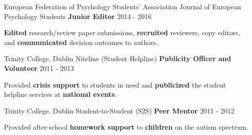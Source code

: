 \begin{cventries}
  \cventry
    {European Federation of Psychology Students' Association}
    {Journal of European Psychology Students} %
    {\textbf{Junior Editor}} %
    {2014 - 2016} %
    {
      \begin{cvitems} %
        \item {\textbf{Edited} research/review paper submissions, \textbf{recruited} reviewers, copy editors, and \textbf{communicated} decision outcomes to authors.}
      \end{cvitems}
    }
    
  \cventry
  	{Trinity College, Dublin}
  	{Niteline (Student Helpline)} %
    {\textbf{Publicity Officer and Volunteer}} %
    {2011 - 2013} %
    {
      \begin{cvitems} %
        \item {Provided \textbf{crisis support} to students in need and \textbf{publicized} the student helpline services at \textbf{national events}.}
      \end{cvitems}
    }
    
  \cventry
    {Trinity College, Dublin}
    {Student-to-Student (S2S)} %
    {\textbf{Peer Mentor}} %
    {2011 - 2012} %
    {
      \begin{cvitems} %
        \item {Provided after-school \textbf{homework support} to \textbf{children} on the autism spectrum.}
      \end{cvitems}
    }

\end{cventries}
